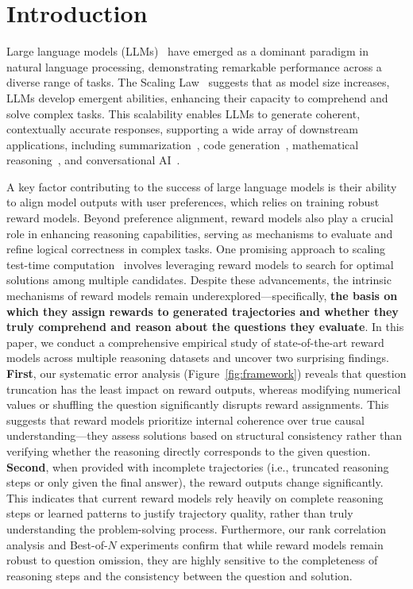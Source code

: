 \documentclass{article}
\begin{document}
\section{Introduction} \label{sec:intro}
Large language models (LLMs)~\citep{hurst2024gpt,dubey2024llama,team2024gemini,anthropic2024claude,jiang2023mistral,liu2024deepseek,yang2024qwen2} have emerged as a dominant paradigm in natural language processing, demonstrating remarkable performance across a diverse range of tasks. The Scaling Law~\citep{kaplan2020scaling} suggests that as model size increases, LLMs develop emergent abilities, enhancing their capacity to comprehend and solve complex tasks. This scalability enables LLMs to generate coherent, contextually accurate responses, supporting a wide array of downstream applications, including summarization~\citep{zhang2019hibert,zhang2024benchmarking}, code generation~\citep{chen2021evaluating}, mathematical reasoning~\citep{hendrycks2021measuring,zhou2023solving}, and conversational AI~\citep{chatgpt,hurst2024gpt}.

A key factor contributing to the success of large language models is their ability to align model outputs with user preferences\citep{christiano2017deep}, which relies on training robust reward models. Beyond preference alignment, reward models also play a crucial role in enhancing reasoning capabilities, serving as mechanisms to evaluate and refine logical correctness in complex tasks\citep{cobbe2021training,lightman2023let}. One promising approach to scaling test-time computation~\citep{snell2024scaling,brown2024large,cobbe2021training,dong2023raft} involves leveraging reward models to search for optimal solutions among multiple candidates. Despite these advancements, the intrinsic mechanisms of reward models remain underexplored—specifically, \textbf{the basis on which they assign rewards to generated trajectories and whether they truly comprehend and reason about the questions they evaluate}. In this paper, we conduct a comprehensive empirical study of state-of-the-art reward models across multiple reasoning datasets and uncover two surprising findings. \textbf{First}, our systematic error analysis (Figure~\ref{fig:framework}) reveals that question truncation has the least impact on reward outputs, whereas modifying numerical values or shuffling the question significantly disrupts reward assignments. This suggests that reward models prioritize internal coherence over true causal understanding—they assess solutions based on structural consistency rather than verifying whether the reasoning directly corresponds to the given question. \textbf{Second}, when provided with incomplete trajectories (i.e., truncated reasoning steps or only given the final answer), the reward outputs change significantly. This indicates that current reward models rely heavily on complete reasoning steps or learned patterns to justify trajectory quality, rather than truly understanding the problem-solving process. Furthermore, our rank correlation analysis and Best-of-$N$ experiments confirm that while reward models remain robust to question omission, they are highly sensitive to the completeness of reasoning steps and the consistency between the question and solution. 
\end{document}
